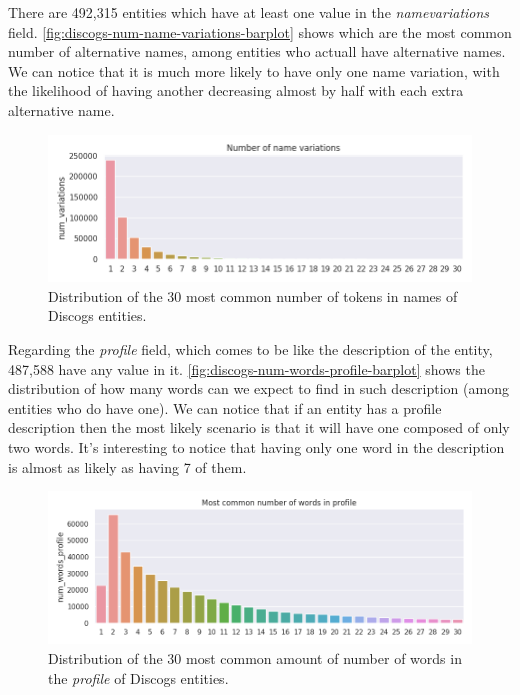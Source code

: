 \documentclass[epsfig,a4paper,11pt,titlepage,twoside,openany]{book}
\begin{document}
There are 492,315 entities which have at least one value in the \textit{namevariations} field. \autoref{fig:discogs-num-name-variations-barplot} shows which are the most common number of alternative names, among entities who actuall have alternative names. We can notice that it is much more likely to have only one name variation, with the likelihood of having another decreasing almost by half with each extra alternative name.

\begin{figure}[]
  \centering \includegraphics[width=\textwidth]{discogs_num_name_variations} 
  \caption{Distribution of the 30 most common number of tokens in names of Discogs entities.}
  \label{fig:discogs-num-name-variations-barplot}
\end{figure}


Regarding the \textit{profile} field, which comes to be like the description of the entity, 487,588 have any value in it. \autoref{fig:discogs-num-words-profile-barplot} shows the distribution of how many words can we expect to find in such description (among entities who do have one). We can notice that if an entity has a profile description then the most likely scenario is that it will have one composed of only two words. It's interesting to notice that having only one word in the description is almost as likely as having 7 of them. 

\begin{figure}[]
  \centering \includegraphics[width=\textwidth]{discogs_num_words_profile} 
  \caption{Distribution of the 30 most common amount of number of words in the \textit{profile} of Discogs entities.}
  \label{fig:discogs-num-words-profile-barplot}
\end{figure}
\end{document}
